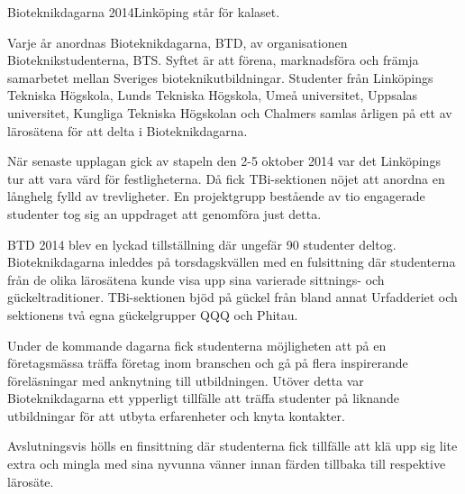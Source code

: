 \begin{news}{2}{Bioteknikdagarna 2014}{Linköping står för kalaset.}{}{}


Varje år anordnas Bioteknikdagarna, BTD, av organisationen
Bioteknikstudenterna, BTS. Syftet är att förena, marknadsföra och
främja samarbetet mellan Sveriges bioteknikutbildningar. Studenter
från Linköpings Tekniska Högskola, Lunds Tekniska Högskola, Umeå
universitet, Uppsalas universitet, Kungliga Tekniska Högskolan och
Chalmers samlas årligen på ett av lärosätena för att delta i
Bioteknikdagarna.



När senaste upplagan gick av stapeln den 2-5 oktober 2014 var det
Linköpings tur att vara värd för festligheterna. Då fick TBi-sektionen
nöjet att anordna en långhelg fylld av trevligheter.  En projektgrupp
bestående av tio engagerade studenter tog sig an uppdraget att
genomföra just detta.

BTD 2014 blev en lyckad tillställning där ungefär 90 studenter
deltog. Bioteknikdagarna inleddes på torsdagskvällen med en
fulsittning där studenterna från de olika lärosätena kunde visa upp
sina varierade sittnings- och gückeltraditioner. TBi-sektionen bjöd på
gückel från bland annat Urfadderiet och sektionens två egna
gückelgrupper QQQ och Phitau.

Under de kommande dagarna fick studenterna möjligheten att på en
företagsmässa träffa företag inom branschen och gå på flera
inspirerande föreläsningar med anknytning till utbildningen. Utöver
detta var Bioteknikdagarna ett ypperligt tillfälle att träffa
studenter på liknande utbildningar för att utbyta erfarenheter och
knyta kontakter.

Avslutningsvis hölls en finsittning där studenterna fick tillfälle att
klä upp sig lite extra och mingla med sina nyvunna vänner innan färden
tillbaka till respektive lärosäte.
\end{news}
